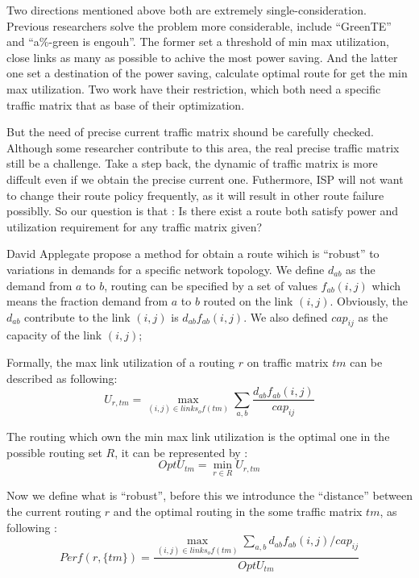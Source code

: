\documentclass[conference]{IEEEtran}
\begin{document}
Two directions mentioned above both are extremely single-consideration. Previous researchers solve the problem more considerable,
include ``GreenTE'' and ``a\%-green is engouh''. The former set a threshold of min max utilization, close links as many 
as possible to achive the most power saving. And the latter one set a destination of the power saving, calculate optimal route 
for get the min max utilization. Two work have their restriction, which both need a specific traffic matrix that as base of 
their optimization.

But the need of precise current traffic matrix shound be carefully checked. Although some researcher contribute to this area,
the real precise traffic matrix still be a challenge. Take a step back, the dynamic of traffic matrix is more diffcult even
if we obtain the precise current one. Futhermore, ISP will not want to change their route policy frequently, as it will result
in other route failure possiblly. So our question is that : Is there exist a route both satisfy power and utilization 
requirement for any traffic matrix given?

David Applegate propose a method for obtain a route wihich is ``robust'' to variations in demands for a specific network 
topology. We define $d_{ab}$ as the demand from $a$ to $b$, routing can be specified by a set of values $f_{ab}(i,j)$ which 
means the fraction demand from $a$ to $b$ routed on the link $(i,j)$. Obviously, the $d_{ab}$ contribute to the link $(i,j)$ is 
$d_{ab}f_{ab}(i,j)$. We also defined $cap_{ij}$ as the capacity of the link $(i,j)$; 

Formally, the max link utilization of a routing $r$ on traffic matrix $tm$ can be described as following:
\begin{equation}
U_{r,tm} = \max_{(i,j)\in links_of(tm)} \sum_{a,b} \frac{d_{ab}f_{ab}(i,j)}{cap_{ij}}
\end{equation}

The routing which own the min max link utilization is the optimal one in the possible routing set $R$, it can be represented by :
\begin{equation}
OptU_{tm} = \min_{r\in R} U_{r,tm}
\end{equation}

Now we define what is ``robust'', before this we introdunce the ``distance'' between the current routing $r$ and the optimal routing
in the some traffic matrix $tm$, as following :
\begin{equation}
Perf(r,\{ tm \}) = \frac{\max_{(i,j)\in links_of(tm)} \sum_{a,b} d_{ab}f_{ab}(i,j)/cap_{ij}}{OptU_{tm}}
\end{equation}
\end{document}
